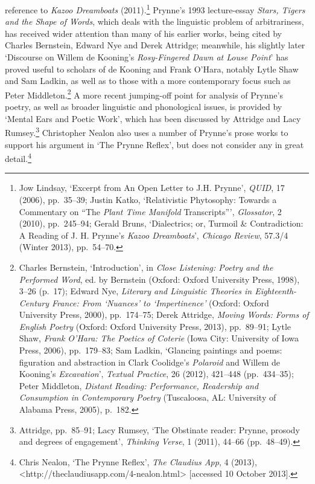 \documentclass[]{article}
\begin{document}
reference to \emph{Kazoo Dreamboats} (2011).\footnote{Jow Lindsay,
  ‘Excerpt from An Open Letter to J.H. Prynne’, \emph{QUID}, 17 (2006),
  pp.~35–39; Justin Katko, ‘Relativistic Phytosophy: Towards a
  Commentary on “The \emph{Plant Time Manifold} Transcripts”’,
  \emph{Glossator}, 2 (2010), pp.~245–94; Gerald Bruns, ‘Dialectrics;
  or, Turmoil \& Contradiction: A Reading of J. H. Prynne’s \emph{Kazoo
  Dreamboats}’, \emph{Chicago Review}, 57.3/4 (Winter 2013), pp.~54–70.}
Prynne’s 1993 lecture-essay \emph{Stars, Tigers and the Shape of Words},
which deals with the linguistic problem of arbitrariness, has received
wider attention than many of his earlier works, being cited by Charles
Bernstein, Edward Nye and Derek Attridge; meanwhile, his slightly later
‘Discourse on Willem de Kooning’s \emph{Rosy-Fingered Dawn at Louse
Point}’ has proved useful to scholars of de Kooning and Frank O’Hara,
notably Lytle Shaw and Sam Ladkin, as well as to those with a more
contemporary focus such as Peter Middleton.\footnote{Charles Bernstein,
  ‘Introduction’, in \emph{Close Listening: Poetry and the Performed
  Word}, ed. by Bernstein (Oxford: Oxford University Press, 1998), 3–26
  (p.~17); Edward Nye, \emph{Literary and Linguistic Theories in
  Eighteenth-Century France: From ‘Nuances’ to ‘Impertinence’} (Oxford:
  Oxford University Press, 2000), pp.~174–75; Derek Attridge,
  \emph{Moving Words: Forms of English Poetry} (Oxford: Oxford
  University Press, 2013), pp.~89–91; Lytle Shaw, \emph{Frank O’Hara:
  The Poetics of Coterie} (Iowa City: University of Iowa Press, 2006),
  pp.~179–83; Sam Ladkin, ‘Glancing paintings and poems: figuration and
  abstraction in Clark Coolidge’s \emph{Polaroid} and Willem de
  Kooning’s \emph{Excavation}’, \emph{Textual Practice}, 26 (2012),
  421–448 (pp.~434–35); Peter Middleton, \emph{Distant Reading:
  Performance, Readership and Consumption in Contemporary Poetry}
  (Tuscaloosa, AL: University of Alabama Press, 2005), p.~182.} A more
recent jumping-off point for analysis of Prynne’s poetry, as well as
broader linguistic and phonological issues, is provided by ‘Mental Ears
and Poetic Work’, which has been discussed by Attridge and Lacy
Rumsey.\footnote{Attridge, pp.~85–91; Lacy Rumsey, ‘The Obstinate
  reader: Prynne, prosody and degrees of engagement’, \emph{Thinking
  Verse}, 1 (2011), 44–66 (pp.~48–49).} Christopher Nealon also uses a
number of Prynne’s prose works to support his argument in ‘The Prynne
Reflex’, but does not consider any in great detail.\footnote{Chris
  Nealon, ‘The Prynne Reflex’, \emph{The Claudius App}, 4 (2013),
  \textless{}http://theclaudiusapp.com/4-nealon.html\textgreater{}
  {[}accessed 10 October 2013{]}.}
\end{document}
